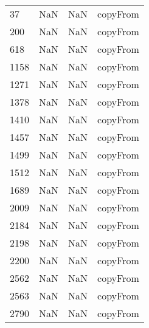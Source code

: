 \begin{tabular}{llll}
37   &                   NaN &                        NaN &                                  copyFrom \\
200  &                   NaN &                        NaN &                                  copyFrom \\
618  &                   NaN &                        NaN &                                  copyFrom \\
1158 &                   NaN &                        NaN &                                  copyFrom \\
1271 &                   NaN &                        NaN &                                  copyFrom \\
1378 &                   NaN &                        NaN &                                  copyFrom \\
1410 &                   NaN &                        NaN &                                  copyFrom \\
1457 &                   NaN &                        NaN &                                  copyFrom \\
1499 &                   NaN &                        NaN &                                  copyFrom \\
1512 &                   NaN &                        NaN &                                  copyFrom \\
1689 &                   NaN &                        NaN &                                  copyFrom \\
2009 &                   NaN &                        NaN &                                  copyFrom \\
2184 &                   NaN &                        NaN &                                  copyFrom \\
2198 &                   NaN &                        NaN &                                  copyFrom \\
2200 &                   NaN &                        NaN &                                  copyFrom \\
2562 &                   NaN &                        NaN &                                  copyFrom \\
2563 &                   NaN &                        NaN &                                  copyFrom \\
2790 &                   NaN &                        NaN &                                  copyFrom \\

\end{tabular}
